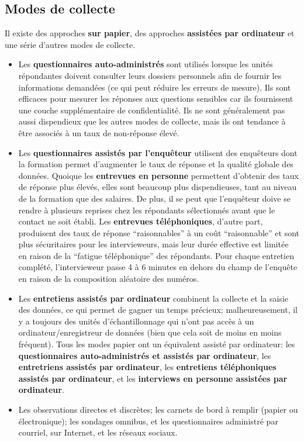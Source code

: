 \subsection{Modes de collecte}
Il existe des approches \textbf{sur papier}, des approches \textbf{assistées par ordinateur} et une série d'autres modes de collecte.
\begin{itemize}
\item Les \textbf{questionnaires auto-administrés} sont u\-ti\-li\-sés lorsque les unités répondantes doivent consulter leurs dossiers personnels afin de fournir les informations demandées (ce qui peut réduire les erreurs de mesure). Ils sont efficaces pour mesurer les réponses aux questions sensibles car ils fournissent une couche supplémentaire de confidentialité. Ils ne sont généralement pas aussi dispendieux que les autres modes de collecte, mais ils ont tendance à être associés à un taux de non-réponse élevé. 
\item Les \textbf{questionnaires assistés par l'enquêteur} u\-ti\-li\-sent des enquêteurs dont la formation permet d'aug\-men\-ter le taux de réponse et la qualité globale des données. Quoique les \textbf{entrevues en personne} permettent d'obtenir des taux de réponse plus élevés, elles sont beaucoup plus dispendieuses, tant au niveau de la formation que des salaires. De plus, il se peut que l'enquêteur doive se rendre à plusieurs reprises chez les répondants sélectionnés avant que le contact ne soit établi. Les \textbf{entrevues téléphoniques}, d'autre part, produisent des taux de réponse ``raisonnables'' à un coût ``raisonnable'' et sont plus sécuritaires pour les intervieweurs, mais leur durée effective est limitée en raison de la ``fatigue t\'el\'ephonique'' des répondants. Pour chaque entretien complété, l'intervieweur passe 4 à 6 minutes en dehors du champ de l'enquête en raison de la composition aléatoire des numéros.
\item Les \textbf{entretiens assistés par ordinateur} combinent la collecte et la saisie des données, ce qui permet de gagner un temps précieux; malheureusement, il y a toujours des unités d'échantillonnage qui n'ont pas accès à un ordinateur/enregistreur de données (bien que cela soit de moins en moins fréquent). Tous les modes papier ont un équivalent assisté par ordinateur: les \textbf{questionnaires auto-administr\'es et assistés par ordinateur}, les \textbf{entretriens assist\'es par ordinateur}, les \textbf{entretiens t\'el\'ephoniques assist\'es par ordinateur}, et les \textbf{interviews en personne assist\'ees par ordinateur}.
\item Les observations directes et discrètes; les carnets de bord à remplir (papier ou électronique); les sondages omnibus, et les questionnaires administr\'e par courriel, sur Internet, et les r\'eseaux sociaux.
\end{itemize}
